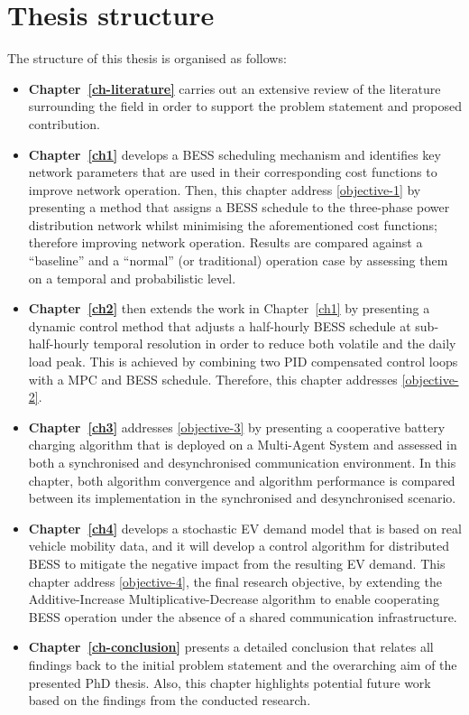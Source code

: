 \section{Thesis structure}
\label{ch-introduction:sec:thesis-structure}

The structure of this thesis is organised as follows:

\begin{itemize}
	\item
	\textbf{Chapter~\ref{ch-literature}} carries out an extensive review of the literature surrounding the field in order to support the problem statement and proposed contribution.
	\item
	\textbf{Chapter~\ref{ch1}} develops a BESS scheduling mechanism and identifies key network parameters that are used in their corresponding cost functions to improve network operation.
	Then, this chapter address \ref{objective-1} by presenting a method that assigns a BESS schedule to the three-phase power distribution network whilst minimising the aforementioned cost functions; therefore improving network operation.
	Results are compared against a ``baseline'' and a ``normal'' (or traditional) operation case by assessing them on a temporal and probabilistic level.
	\item
	\textbf{Chapter~\ref{ch2}} then extends the work in Chapter~\ref{ch1} by presenting a dynamic control method that adjusts a half-hourly BESS schedule at sub-half-hourly temporal resolution in order to reduce both volatile and the daily load peak.
	This is achieved by combining two PID compensated control loops with a MPC and BESS schedule.
	Therefore, this chapter addresses \ref{objective-2}.
	\item
	\textbf{Chapter~\ref{ch3}} addresses \ref{objective-3} by presenting a cooperative battery charging algorithm that is deployed on a Multi-Agent System and assessed in both a synchronised and desynchronised communication environment.
	In this chapter, both algorithm convergence and algorithm performance is compared between its implementation in the synchronised and desynchronised scenario.
	\item
	\textbf{Chapter~\ref{ch4}} develops a stochastic EV demand model that is based on real vehicle mobility data, and it will develop a control algorithm for distributed BESS to mitigate the negative impact from the resulting EV demand.
	This chapter address \ref{objective-4}, the final research objective, by extending the Additive-Increase Multiplicative-Decrease algorithm to enable cooperating BESS operation under the absence of a shared communication infrastructure.
	\item
	\textbf{Chapter~\ref{ch-conclusion}} presents a detailed conclusion that relates all findings back to the initial problem statement and the overarching aim of the presented PhD thesis.
	Also, this chapter highlights potential future work based on the findings from the conducted research.
\end{itemize}